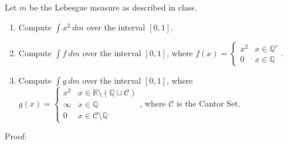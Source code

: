 \documentclass[12pt]{article}
\begin{document}
Let $m$ be the Lebesgue measure as described in class.
\begin{enumerate}
\item Compute $\int x^2~dm$ over the interval $[0,1]$.
\item Compute $\int f~dm$ over the interval $[0,1]$, where $f(x)=\begin{cases} x^2&x\in \mathbb{Q}^c\\0&x\in\mathbb{Q}\end{cases}$.
\item Compute $\int g~dm$ over the interval $[0,1]$, where $g(x)=\begin{cases}x^2&x\in\mathbb{R}\setminus(\mathbb{Q}\cup\mathscr{C})\\\infty&x\in\mathbb{Q}\\0&x\in\mathscr{C}\setminus\mathbb{Q}\end{cases}$, where $\mathscr{C}$ is the Cantor Set.
\end{enumerate}

Proof:
\end{document}
